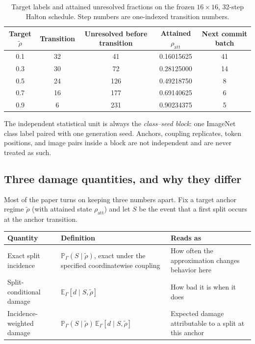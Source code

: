 \documentclass[11pt,a4paper]{article}
\theoremstyle{plain}
\theoremstyle{definition}
\theoremstyle{remark}
\newcommand{\Ex}{\mathbb{E}}
\newcommand{\Prob}{\mathbb{P}}
\newcommand{\rholabel}{\widetilde{\rho}}
\newcommand{\rhoatt}{\rho_{\mathrm{att}}}
\begin{document}
\begin{table}[t]
\centering
\caption{Target labels and attained unresolved fractions on the frozen
$16\times16$, 32-step Halton schedule. Step numbers are one-indexed transition
numbers.}
\label{tab:anchors}
\small
\begin{tabular}{@{}ccccc@{}}
\toprule
Target $\rholabel$ & Transition & Unresolved before transition &
Attained $\rhoatt$ & Next commit batch \\
\midrule
0.1 & 32 & 41  & 0.16015625 & 41 \\
0.3 & 30 & 72  & 0.28125000 & 14 \\
0.5 & 24 & 126 & 0.49218750 & 8  \\
0.7 & 16 & 177 & 0.69140625 & 6  \\
0.9 & 6  & 231 & 0.90234375 & 5  \\
\bottomrule
\end{tabular}
\end{table}

The independent statistical unit is always the \emph{class--seed block}: one
ImageNet class label paired with one generation seed. Anchors, coupling
replicates, token positions, and image pairs inside a block are not independent
and are never treated as such.

\subsection{Three damage quantities, and why they differ}
\label{sec:threenumbers}
Most of the paper turns on keeping three numbers apart. Fix a target anchor regime
$\rholabel$ (with attained state $\rhoatt$) and let $S$ be the event that a first split occurs at the anchor
transition.

\begin{center}
\small
\begin{tabular}{@{}p{}p{}p{}@{}}
\toprule
\textbf{Quantity} & \textbf{Definition} & \textbf{Reads as} \\
\midrule
Exact split incidence &
$\Prob_\Gamma(S \mid \rholabel)$, exact under the specified coordinatewise coupling &
How often the approximation changes behavior here \\[4pt]
Split-conditional damage &
$\Ex_\Gamma[d \mid S,\rholabel]$ &
How bad it is when it does \\[4pt]
Incidence-weighted damage &
$\Prob_\Gamma(S\mid\rholabel)\,\Ex_\Gamma[d\mid S,\rholabel]$ &
Expected damage attributable to a split at this anchor \\
\bottomrule
\end{tabular}
\end{center}
\end{document}
